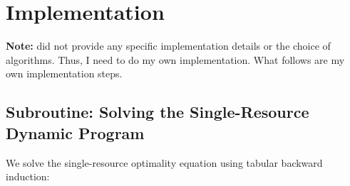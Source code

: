 \documentclass[11pt]{article}
\begin{document}

\section{Implementation}

\noindent
\textbf{Note:} \cite{topaloglu2009using} did not provide any specific implementation details or the choice of algorithms. Thus, I need to do my own implementation. What follows are my own implementation steps.

\vspace{0.5cm}



\subsection{Subroutine: Solving the Single-Resource Dynamic Program}

\noindent
We solve the single-resource optimality equation using tabular backward induction:
\end{document}
